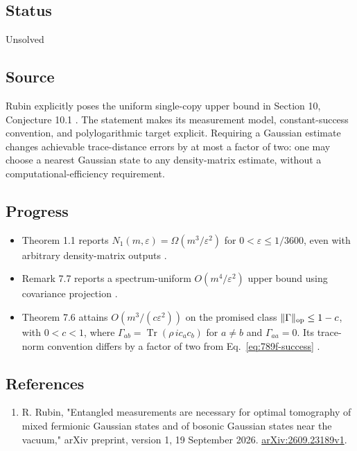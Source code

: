 \subsection*{Status}

Unsolved

\subsection*{Source}

Rubin explicitly poses the uniform single-copy upper bound in Section 10, Conjecture 10.1 . The statement makes its measurement model, constant-success convention, and polylogarithmic target explicit. Requiring a Gaussian estimate changes achievable trace-distance errors by at most a factor of two: one may choose a nearest Gaussian state to any density-matrix estimate, without a computational-efficiency requirement.

\subsection*{Progress}

\begin{itemize}
  \item Theorem 1.1 reports $N_1(m,\varepsilon)=\Omega(m^3/\varepsilon^2)$ for $0<\varepsilon\leq1/3600$, even with arbitrary density-matrix outputs .

  \item Remark 7.7 reports a spectrum-uniform $O(m^4/\varepsilon^2)$ upper bound using covariance projection .

  \item Theorem 7.6 attains $O(m^3/(c\varepsilon^2))$ on the promised class $\|\Gamma\|_{\rm op}\leq1-c$, with $0<c<1$, where $\Gamma_{ab}=\operatorname{Tr}(\rho\,ic_ac_b)$ for $a\ne b$ and $\Gamma_{aa}=0$. Its trace-norm convention differs by a factor of two from Eq.~\eqref{eq:789f-success} .
\end{itemize}

\subsection*{References}

\begin{enumerate}[label={},leftmargin=4.8em,labelsep=0.5em]
  \footnotesize
  \item[\textup{[Rub26]}]\label{ref:789f-rubin}
  R. Rubin, "Entangled measurements are necessary for optimal tomography of mixed fermionic Gaussian states and of bosonic Gaussian states near the vacuum," arXiv preprint, version 1, 19 September 2026. \href{https://arxiv.org/abs/2609.23189v1}{arXiv:2609.23189v1}.
\end{enumerate}


